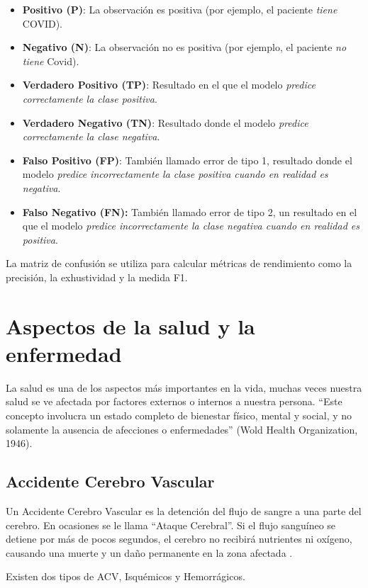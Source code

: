 \begin{itemize}
	\item \textbf{Positivo (P)}: La observación es positiva (por ejemplo, el paciente \textit{tiene} COVID).
	\item \textbf{Negativo (N)}: La observación no es positiva (por ejemplo, el paciente \textit{no tiene} Covid).
	\item \textbf{Verdadero Positivo (TP)}: Resultado en el que el modelo \textit{predice correctamente la clase positiva}.
	\item \textbf{Verdadero Negativo (TN)}: Resultado donde el modelo \textit{predice correctamente la clase negativa}.
	\item \textbf{Falso Positivo (FP)}: También llamado error de tipo 1, resultado donde el modelo \textit{predice incorrectamente la clase positiva cuando en realidad es negativa}.
	\item \textbf{Falso Negativo (FN):} También llamado error de tipo 2, un resultado en el que el modelo \textit{predice incorrectamente la clase negativa cuando en realidad es positiva}.
\end{itemize}

\par La matriz de confusión se utiliza para calcular métricas de rendimiento como la precisión, la exhustividad y la medida F1.

\doublespacing
\section{Aspectos de la salud y la enfermedad}
La salud es una de los aspectos más importantes en la vida, muchas veces nuestra salud se ve afectada por factores externos o internos a nuestra persona. “Este concepto involucra un estado completo de bienestar físico, mental y social, y no solamente la ausencia de afecciones o enfermedades” (Wold Health Organization, 1946).  \\

\doublespacing
\subsection{Accidente Cerebro Vascular}
\par Un Accidente Cerebro Vascular es la detención del flujo de sangre a una parte del cerebro. En ocasiones se le llama “Ataque Cerebral”. Si el flujo sanguíneo se detiene por más de pocos segundos, el cerebro no recibirá nutrientes ni oxígeno, causando una muerte y un daño permanente en la zona afectada \cite{Garcia2019}.
\par Existen dos tipos de ACV, Isquémicos y Hemorrágicos.\\

